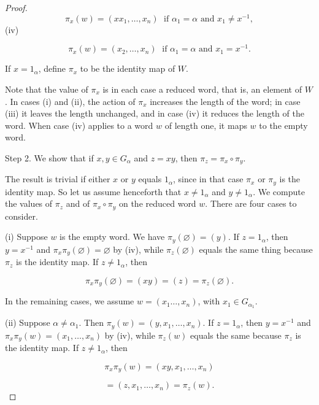 \begin{proof}
\[
{\pi }_{x}( w) = ( {xx_{1},\ldots ,x_{n}}) \;\text{ if }{\alpha }_{1} = \alpha \text{ and }x_{1} \neq {x}^{-1},
\]
(iv)

\[
{\pi }_{x}( w) = ( {x_{2},\ldots ,x_{n}}) \;\text{ if }{\alpha }_{1} = \alpha \text{ and }x_{1} = x^{-1}.
\]

If \(x = 1_{\alpha }\), define \({\pi }_{x}\) to be the identity map of \(W\).

Note that the value of \({\pi }_{x}\) is in each case a reduced word, that is, an element of \(W\). In cases (i) and (ii), the action of \({\pi }_{x}\) increases the length of the word; in case (iii) it leaves the length unchanged, and in case (iv) it reduces the length of the word. When case (iv) applies to a word \(w\) of length one, it maps \(w\) to the empty word.

Step 2. We show that if \(x,y \in {G}_{\alpha }\) and \(z = {xy}\), then \({\pi }_{z} = {\pi }_{x} \circ {\pi }_{y}\).

The result is trivial if either \(x\) or \(y\) equals \(1_{\alpha }\), since in that case \({\pi }_{x}\) or \({\pi }_{y}\) is the identity map. So let us assume henceforth that \(x \neq {1}_{\alpha }\) and \(y \neq {1}_{\alpha }\). We compute the values of \({\pi }_{z}\) and of \({\pi }_{x} \circ {\pi }_{y}\) on the reduced word \(w\). There are four cases to consider.

(i) Suppose \(w\) is the empty word. We have \({\pi }_{y}( \varnothing ) = ( y)\). If \(z = 1_{\alpha }\), then \(y = x^{-1}\) and \({\pi }_{x}{\pi }_{y}( \varnothing ) = \varnothing\) by (iv), while \({\pi }_{z}( \varnothing )\) equals the same thing because \({\pi }_{z}\) is the identity map. If \(z \neq {1}_{\alpha }\), then

\[
{\pi }_{x}{\pi }_{y}( \varnothing ) = ( {xy}) = ( z) = {\pi }_{z}( \varnothing ).
\]

In the remaining cases, we assume \(w = ( {x_{1}\ldots ,x_{n}})\), with \(x_{1} \in {G}_{{\alpha }_{1}}\).

(ii) Suppose \(\alpha \neq {\alpha }_{1}\). Then \({\pi }_{y}( w) = ( {y,x_{1},\ldots ,x_{n}})\). If \(z = 1_{\alpha }\), then \(y = x^{-1}\) and \({\pi }_{x}{\pi }_{y}( w) = ( {x_{1},\ldots ,x_{n}})\) by (iv), while \({\pi }_{z}( w)\) equals the same because \({\pi }_{z}\) is the identity map. If \(z \neq {1}_{\alpha }\), then

\[
{\pi }_{x}{\pi }_{y}( w) = ( {{xy},x_{1},\ldots ,x_{n}})
\]

\[
= ( {z,x_{1},\ldots ,x_{n}}) = {\pi }_{z}( w).
\]


\end{proof}
